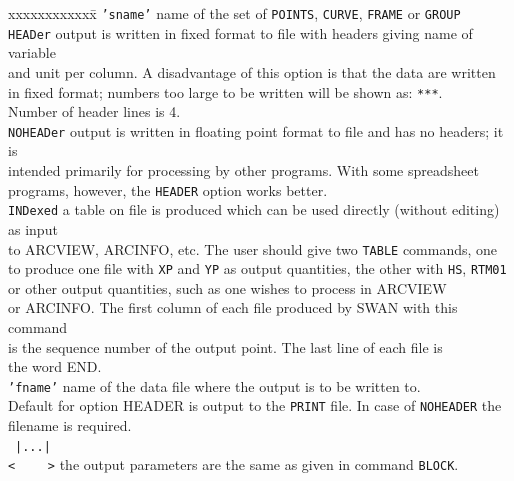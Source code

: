 \documentclass[12pt]{book}
\begin{document}
\begin{tabbing}
 xxxxxxxxxxxx\= \kill
{\tt {'sname'}} \> name of the set of {\tt POINTS}, {\tt CURVE}, {\tt FRAME} or {\tt GROUP}\\
{\tt HEADer}    \> output is written in fixed format to file with headers giving name of variable\+\\
                   and unit per column. A disadvantage of this option is that the data are written\\
                   in fixed format; numbers too large to be written will be shown as: {\tt ****}.\\
                   Number of header lines is 4.\-\\
{\tt NOHEADer}  \> output is written in floating point format to file and has no headers; it is\+\\
                   intended primarily for processing by other programs. With some spreadsheet\\
                   programs, however, the {\tt HEADER} option works better.\-\\
{\tt INDexed}   \> a table on file is produced which can be used directly (without editing) as input\+\\
                   to ARCVIEW, ARCINFO, etc. The user should give two {\tt TABLE} commands, one\\
                   to produce one file with {\tt XP} and {\tt YP} as output quantities, the other with {\tt HS}, {\tt RTM01}\\
                   or other output quantities, such as one wishes to process in ARCVIEW\\
                   or ARCINFO. The first column of each file produced by SWAN with this command\\
                   is the sequence  number of the output point. The last line of each file is\\
                   the word END.\-\\
{\tt {'fname'}} \> name of the data file where the output is to be written to.\+\\
                   Default for option HEADER is output to the {\tt PRINT} file. In case of {\tt NOHEADER} the\\
                   filename is required.\-\\
\, {\tt  |...|}    \> \\
{\tt <} \, \, \, \, {\tt >} \> the output parameters are the same as given in command {\tt BLOCK}.\\

\end{tabbing}
\end{document}

